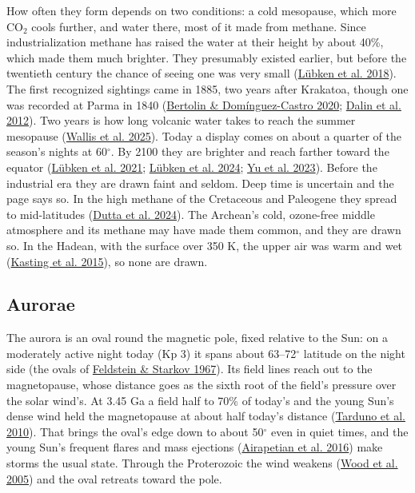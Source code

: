 \documentclass[9pt,twocolumn]{extarticle}
\begin{document}
How often they form depends on two conditions: a cold mesopause, which more CO$_2$ cools further, and water there, most of it made from methane. Since industrialization methane has raised the water at their height by about 40\%, which made them much brighter. They presumably existed earlier, but before the twentieth century the chance of seeing one was very small (\protect\hyperlink{cite.lubken2018}{Lübken et al. 2018}). The first recognized sightings came in 1885, two years after Krakatoa, though one was recorded at Parma in 1840 (\protect\hyperlink{cite.bertolin2020}{Bertolin \& Domínguez-Castro 2020}; \protect\hyperlink{cite.dalin2012}{Dalin et al. 2012}). Two years is how long volcanic water takes to reach the summer mesopause (\protect\hyperlink{cite.wallis2025}{Wallis et al. 2025}). Today a display comes on about a quarter of the season's nights at 60$^\circ$. By 2100 they are brighter and reach farther toward the equator (\protect\hyperlink{cite.lubken2021}{Lübken et al. 2021}; \protect\hyperlink{cite.lubken2024}{Lübken et al. 2024}; \protect\hyperlink{cite.yu2023}{Yu et al. 2023}). Before the industrial era they are drawn faint and seldom. Deep time is uncertain and the page says so. In the high methane of the Cretaceous and Paleogene they spread to mid-latitudes (\protect\hyperlink{cite.dutta2024}{Dutta et al. 2024}). The Archean's cold, ozone-free middle atmosphere and its methane may have made them common, and they are drawn so. In the Hadean, with the surface over 350 K, the upper air was warm and wet (\protect\hyperlink{cite.kasting2015}{Kasting et al. 2015}), so none are drawn.


\subsection{Aurorae}\label{aurorae}

The aurora is an oval round the magnetic pole, fixed relative to the Sun: on a moderately active night today (Kp 3) it spans about 63--72$^\circ$ latitude on the night side (the ovals of \protect\hyperlink{cite.feldstein1967}{Feldstein \& Starkov 1967}). Its field lines reach out to the magnetopause, whose distance goes as the sixth root of the field's pressure over the solar wind's. At 3.45 Ga a field half to 70\% of today's and the young Sun's dense wind held the magnetopause at about half today's distance (\protect\hyperlink{cite.tarduno2010}{Tarduno et al. 2010}). That brings the oval's edge down to about 50$^\circ$ even in quiet times, and the young Sun's frequent flares and mass ejections (\protect\hyperlink{cite.airapetian2016}{Airapetian et al. 2016}) make storms the usual state. Through the Proterozoic the wind weakens (\protect\hyperlink{cite.wood2005}{Wood et al. 2005}) and the oval retreats toward the pole.
\end{document}
